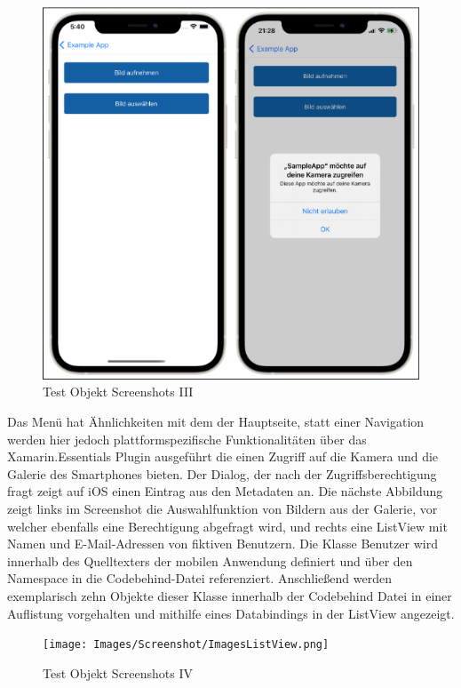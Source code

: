 \newpage 
\begin{figure}[!ht]
 \includegraphics[width=\textwidth,keepaspectratio]{Images/Screenshot/Permissions.png}
 \caption{Test Objekt Screenshots III}
 \label{fig:TestObjectIII}
\end{figure}
Das Menü hat Ähnlichkeiten mit dem der Hauptseite,  statt einer Navigation werden hier jedoch plattformspezifische Funktionalitäten über das Xamarin.Essentials Plugin ausgeführt die einen Zugriff auf die Kamera und die Galerie des Smartphones bieten.  Der Dialog,  der nach der Zugriffsberechtigung fragt zeigt auf iOS einen Eintrag aus den Metadaten an.
Die nächste Abbildung zeigt links im Screenshot die Auswahlfunktion von Bildern aus der Galerie,  vor welcher ebenfalls eine Berechtigung abgefragt wird, 
und rechts eine ListView mit Namen und E-Mail-Adressen von fiktiven Benutzern.  Die Klasse Benutzer wird innerhalb des Quelltexters der mobilen Anwendung definiert und über den Namespace in die Codebehind-Datei referenziert.  Anschließend werden exemplarisch zehn Objekte dieser Klasse innerhalb der Codebehind Datei in einer Auflistung vorgehalten und mithilfe eines Databindings in der ListView angezeigt. 
\newpage 
\begin{figure}[!ht]
 \texttt{[image: Images/Screenshot/ImagesListView.png]}
 \caption{Test Objekt Screenshots IV}
 \label{fig:TestObjectIV}
\end{figure}


